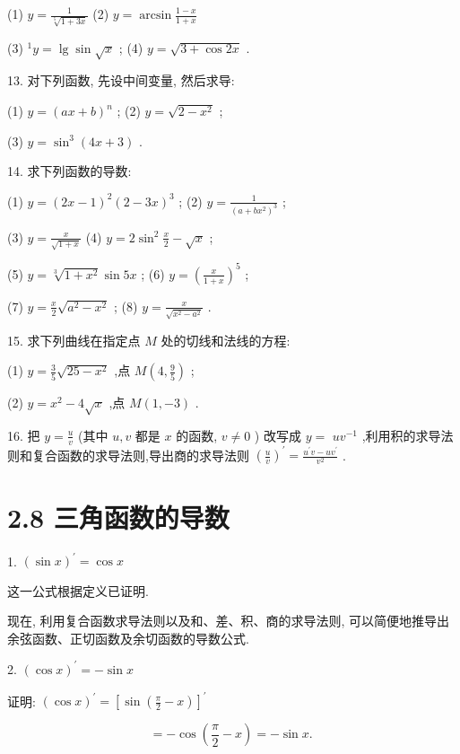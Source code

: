 \documentclass[10pt]{article}
\begin{document}
(1) \(y = \frac{1}{\sqrt[5]{1 + {3x}}}\) (2) \(y = \arcsin \frac{1 - x}{1 + x}\)

(3) \({}^{1}y = \lg \sin \sqrt{x}\) ; (4) \(y = \sqrt{3 + \cos {2x}}\) .

13. 对下列函数, 先设中间变量, 然后求导:

(1) \(y = {\left( ax + b\right) }^{n}\) ; (2) \(y = \sqrt{2 - {x}^{2}}\) ;

(3) \(y = {\sin }^{3}\left( {{4x} + 3}\right)\) .

14. 求下列函数的导数:

(1) \(y = {\left( 2x - 1\right) }^{2}{\left( 2 - 3x\right) }^{3}\) ; (2) \(y = \frac{1}{{\left( a + b{x}^{2}\right) }^{3}}\) ;

(3) \(y = \frac{x}{\sqrt{1 + x}}\) (4) \(y = 2{\sin }^{2}\frac{x}{2} - \sqrt{x}\) ;

(5) \(y = \sqrt[3]{1 + {x}^{2}}\sin {5x}\) ; (6) \(y = {\left( \frac{x}{1 + x}\right) }^{5}\) ;

(7) \(y = \frac{x}{2}\sqrt{{a}^{2} - {x}^{2}}\) ; (8) \(y = \frac{x}{\sqrt{{x}^{2} - {a}^{2}}}\) .

15. 求下列曲线在指定点 \(M\) 处的切线和法线的方程:

(1) \(y = \frac{3}{5}\sqrt{{25} - {x}^{2}}\) ,点 \(M\left( {4,\frac{9}{5}}\right)\) ;

(2) \(y = {x}^{2} - 4\sqrt{x}\) ,点 \(M\left( {1, - 3}\right)\) .

16. 把 \(y = \frac{u}{v}\) (其中 \(u,v\) 都是 \(x\) 的函数, \(v \neq 0\) ) 改写成 \(y =\) \(u{v}^{-1}\) ,利用积的求导法则和复合函数的求导法则,导出商的求导法则 \({\left( \frac{u}{v}\right) }^{\prime } = \frac{{u}^{\prime }v - u{v}^{\prime }}{{v}^{2}}\) .

\section*{2.8 三角函数的导数}

1. \({\left( \sin x\right) }^{\prime } = \cos x\)

这一公式根据定义已证明.

现在, 利用复合函数求导法则以及和、差、积、商的求导法则, 可以简便地推导出余弦函数、正切函数及余切函数的导数公式.

2. \({\left( \cos x\right) }^{\prime } = - \sin x\)

证明: \({\left( \cos x\right) }^{\prime } = {\left\lbrack \sin \left( \frac{\pi }{2} - x\right) \right\rbrack }^{\prime }\)

\[
= - \cos \left( {\frac{\pi }{2} - x}\right) = - \sin x\text{. }
\]
\end{document}
